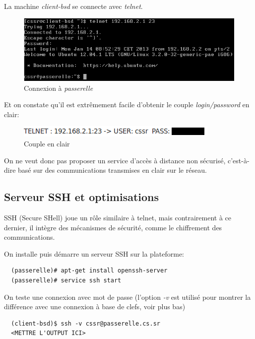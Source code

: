 \documentclass[a4paper]{article}
\begin{document}
La machine \textit{client-bsd} se connecte avec \textit{telnet}.

\begin{figure}[!ht]
	\centering
	\includegraphics[scale=.5]{Telnet.PNG}
	\caption{\label{hosts} Connexion à \textit{passerelle}}
\end{figure}

Et on constate qu'il est extrêmement facile d'obtenir le couple \textit{login/password} en clair:

\begin{figure}[!ht]
	\centering
	\includegraphics[scale=.5]{Telnet_passwd.png}
	\caption{\label{hosts} Couple en clair}
\end{figure}

On ne veut donc pas proposer un service d'accès à distance non sécurisé, c'est-à-dire
basé sur des communications transmises en clair sur le réseau. 

 
\subsection{Serveur SSH  et optimisations}
SSH (Secure SHell) joue un rôle similaire à telnet, mais contrairement à ce
dernier, il intègre des mécanismes de sécurité, comme le chiffrement des
communications.

On installe puis démarre un serveur SSH sur la plateforme:
\begin{verbatim}
  (passerelle)# apt-get install openssh-server
  (passerelle)# service ssh start
\end{verbatim}

On teste une connexion avec mot de passe (l'option \textit{-v} est
utilisé pour montrer la différence avec une connexion à base de
clefs, voir plus bas)
\begin{verbatim}
  (client-bsd)$ ssh -v cssr@passerelle.cs.sr
  <METTRE L'OUTPUT ICI>
\end{verbatim}
\end{document}
